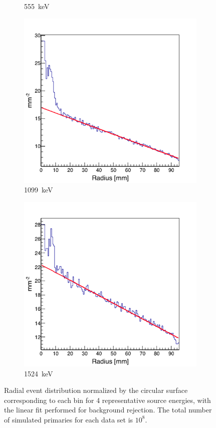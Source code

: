 \begin{figure}
\begin{subfigure}{.5\textwidth}
  \caption{555~keV}
  \label{fig:rad_distr_fit_555keV}
\end{subfigure}
\begin{subfigure}{.5\textwidth}
  \centering
  \includegraphics[width=.9\linewidth]{03_GraphicFiles/chapter4/SPECT/anger/radial_distr/fit_1099keV}
  \caption{1099~keV}
  \label{fig:rad_distr_fit_1099keV}
\end{subfigure}
\begin{subfigure}{.5\textwidth}
  \centering
  \includegraphics[width=.9\linewidth]{03_GraphicFiles/chapter4/SPECT/anger/radial_distr/fit_1524keV}
  \caption{1524~keV}
  \label{fig:rad_distr_fit_1524keV}
\end{subfigure}
\caption{Radial event distribution normalized by the circular surface corresponding to each bin for 4 representative source energies, with the linear fit performed for background rejection. The total number of simulated primaries for each data set is $\mathrm{10^{8}}$.}
\label{fig:distr_with_fit}
\end{figure}

